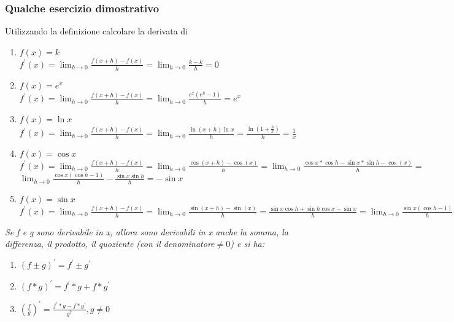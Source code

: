 \subsubsection{Qualche esercizio dimostrativo}
Utilizzando la definizione calcolare la derivata di
\begin{enumerate}
	\item $f(x)=k$\\
		$f^\prime(x)=\lim_{h\to 0}\frac{f(x+h)-f(x)}{h}=\lim_{h\to 0}\frac{k-k}{h}=0$
	\item $f(x)=e^x$\\
		$f^\prime(x)=\lim_{h\to 0}\frac{f(x+h)-f(x)}{h}=\lim_{h\to
		0}\frac{e^x(e^h-1)}{h}=e^x$
	\item $f(x)=\ln x$\\
		$f^\prime(x)=\lim_{h\to 0}\frac{f(x+h)-f(x)}{h}=\lim_{h\to
		0}\frac{\ln(x+h)\ln x}{h}=\frac{\ln(1+\frac{h}{x})}{h}=\frac{1}{x}$
	\item $f(x)=\cos x$\\
		$f^\prime(x)=\lim_{h\to 0}\frac{f(x+h)-f(x)}{h}=\lim_{h\to
		0}\frac{\cos(x+h)-\cos(x)}{h}=\lim_{h\to 0}\frac{\cos x*\cos h-\sin
		x*\sin h-\cos(x)}{h}=$\\$\lim_{h\to 0}\frac{\cos x (\cos h -
		1)}{h}-\frac{\sin x\sin h}{h}=-\sin x$
	\item $f(x)=\sin x$\\
		$f^\prime(x)=\lim_{h\to 0}\frac{f(x+h)-f(x)}{h}=\lim_{h\to
		0}\frac{\sin(x+h)-\sin(x)}{h}=\frac{\sin x \cos h +\sin h \cos x-\sin
		x}{h}=\lim_{h\to 0}\frac{\sin x(\cos h-1)}{h}+\lim_{h\to 0}\frac{\sin
		h\cos x}{h}=\cos x$
\end{enumerate}
\textit{Se f e g sono derivabile in x, allora sono derivabili in x anche la
somma, la differenza, il prodotto, il quoziente (con il denominatore$\neq 0$) e
si ha:}
\begin{enumerate}
	\item $(f\pm g)^\prime=f^\prime\pm g^\prime$
	\item $(f*g)^\prime=f^\prime*g+f*g^\prime$
	\item $(\frac{f}{g})^\prime=\frac{f^\prime*g-f*g^\prime}{g^2}, g\neq 0$
\end{enumerate}
